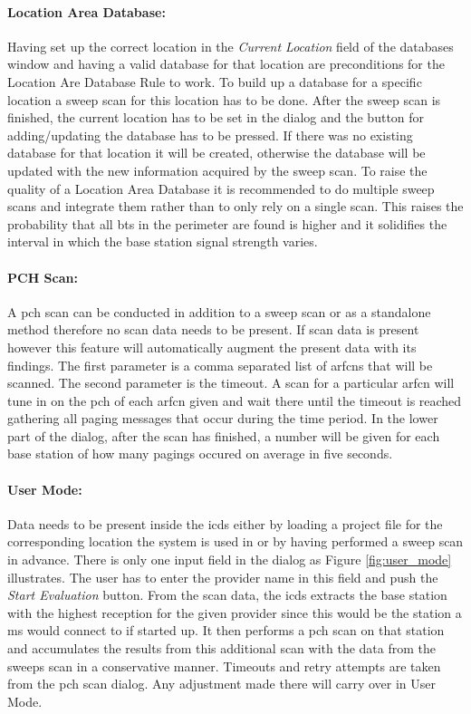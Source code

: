 \paragraph{Location Area Database:} Having set up the correct location in the \emph{Current Location} field of the databases window and having a valid database for that location are preconditions for the Location Are Database Rule to work.
To build up a database for a specific location a sweep scan for this location has to be done.
After the sweep scan is finished, the current location has to be set in the dialog and the button for adding/updating the database has to be pressed.
If there was no existing database for that location it will be created, otherwise the database will be updated with the new information acquired by the sweep scan.
To raise the quality of a Location Area Database it is recommended to do multiple sweep scans and integrate them rather than to only rely on a single scan.
This raises the probability that all \gls{bts} in the perimeter are found is higher and it solidifies the interval in which the base station signal strength varies.

\paragraph{PCH Scan:} A \gls{pch} scan can be conducted in addition to a sweep scan or as a standalone method therefore no scan data needs to be present.
If scan data is present however this feature will automatically augment the present data with its findings.
The first parameter is a comma separated list of \glspl{arfcn} that will be scanned.
The second parameter is the timeout. 
A scan for a particular \gls{arfcn} will tune in on the \gls{pch} of each \gls{arfcn} given and wait there until the timeout is reached gathering all paging messages that occur during the time period.
In the lower part of the dialog, after the scan has finished, a number will be given for each base station of how many pagings occured on average in five seconds.

\paragraph{User Mode:} Data needs to be present inside the \gls{icds} either by loading a project file for the corresponding location the system is used in or by having performed a sweep scan in advance.
There is only one input field in the dialog as Figure \ref{fig:user_mode} illustrates.
The user has to enter the provider name in this field and push the \emph{Start Evaluation} button.
From the scan data, the \gls{icds} extracts the base station with the highest reception for the given provider since this would be the station a \gls{ms} would connect to if started up.
It then performs a \gls{pch} scan on that station and accumulates the results from this additional scan with the data from the sweeps scan in a conservative manner.
Timeouts and retry attempts are taken from the \gls{pch} scan dialog.
Any adjustment made there will carry over in User Mode.

